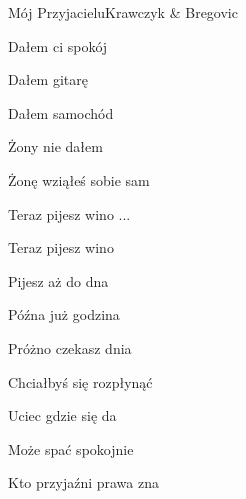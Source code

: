 \begin{song}{Mój Przyjacielu}{}{}{Krawczyk \& Bregovic}{}{}
\begin{SBVerse}
    Dałem ci spokój

    Dałem gitarę

    Dałem samochód

    Żony nie dałem

    Żonę wziąłeś sobie sam
  \end{SBVerse}
  \begin{SBChorus}
    Teraz pijesz wino ...
  \end{SBChorus}
  \begin{SBChorus}
    Teraz pijesz wino

    Pijesz aż do dna

    Późna już godzina

    Próżno czekasz dnia

    Chciałbyś się rozpłynąć

    Uciec gdzie się da

    Może spać spokojnie

    Kto przyjaźni prawa zna
  \end{SBChorus}
\end{song}
